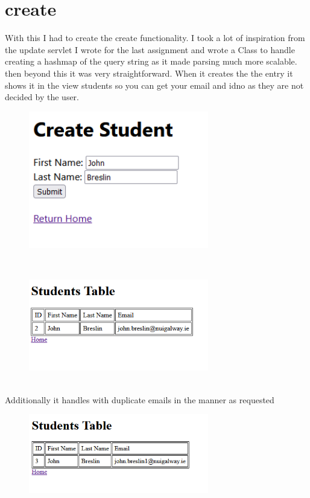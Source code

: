 \documentclass{article}
\begin{document}
	\section{create}
With this I had to create the create functionality. I took a lot of inspiration from the update servlet I wrote for the last assignment and wrote a Class to handle creating a hashmap of the query string as it made parsing much more scalable. then beyond this it was very straightforward. When it creates the the entry it shows it in the view students so you can get your email and idno as they are not decided by the user.
	\begin{figure}[h!]
		\centering
		\includegraphics[width=0.7\textwidth]{2.png}
	\end{figure}
	\\
	\begin{figure}[h!]
		\centering
		\includegraphics[width=0.7\textwidth]{3.png}
	\end{figure}
	\\
	Additionally it handles with duplicate emails in the manner as requested\\
	\begin{figure}[h!]
		\centering
		\includegraphics[width=0.7\textwidth]{4.png}
	\end{figure}
	\newpage
\end{document}
